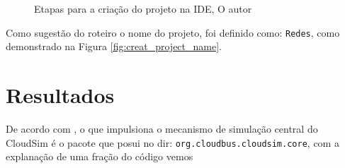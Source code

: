 \begin{figure}[H]
    \center
    \caption{Etapas para a criação do projeto na IDE, O autor}\label{fig:confi_project}
\end{figure}
\par Como sugestão do roteiro o nome do projeto, foi definido como: \verb#Redes#, como demonstrado na Figura \ref{fig:creat_project_name}.




\section{Resultados}
\par De acordo com , o que impulsiona o mecanismo de simulação central do CloudSim é o pacote que posui no dir: \verb#org.cloudbus.cloudsim.core#, com a explanação de uma fração do código vemos

